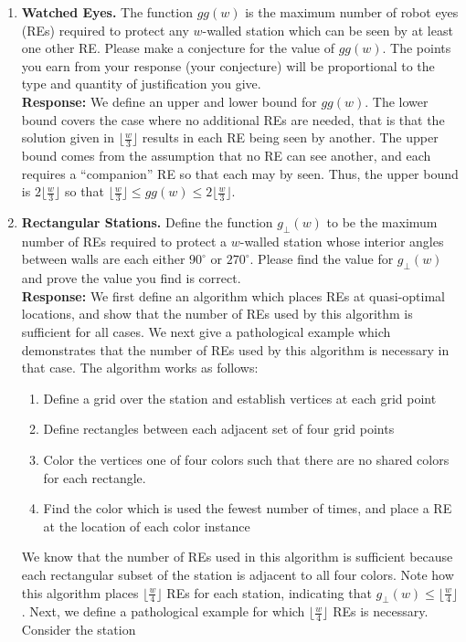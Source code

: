 \documentclass{article}
\newcommand{\response}[1]{\leavevmode\\[0.05in]{\bf Response: } #1 \leavevmode\\[0.05in]}
\begin{document}
\begin{enumerate}
	\item {\bf Watched Eyes.} The function $gg(w)$ is the maximum number of robot eyes (REs) required to protect any $w$-walled station which can be seen by at least one other RE.  Please make a conjecture for the value of $gg(w)$.  The points you earn from your response (your conjecture) will be proportional to the type and quantity of justification you give.  
		\response{We define an upper and lower bound for $gg(w)$.  The lower bound covers the case where no additional REs are needed, that is that the solution given in $\lfloor \frac{w}{3} \rfloor$ results in each RE being seen by another.  The upper bound comes from the assumption that no RE can see another, and each requires a ``companion'' RE so that each may by seen.  Thus, the upper bound is $2\lfloor\frac{w}{3}\rfloor$ so that $\lfloor\frac{w}{3}\rfloor \le gg(w) \le 2\lfloor\frac{w}{3}\rfloor$.}
	\item {\bf Rectangular Stations.}  Define the function $g_{\perp}(w)$ to be the maximum number of REs required to protect a $w$-walled station whose interior angles between walls are each either $90^{\circ}$ or $270^{\circ}$.  Please find the value for $g_{\perp}(w)$ and prove the value you find is correct.
		\response{We first define an algorithm which places REs at quasi-optimal locations, and show that the number of REs used by this algorithm is sufficient for all cases.  We next give a pathological example which demonstrates that the number of REs used by this algorithm is necessary in that case. The algorithm works as follows:
		\begin{enumerate}
			\item Define a grid over the station and establish vertices at each grid point
			\item Define rectangles between each adjacent set of four grid points
			\item Color the vertices one of four colors such that there are no shared colors for each rectangle.
			\item Find the color which is used the fewest number of times, and place a RE at the location of each color instance
		\end{enumerate}
		We know that the number of REs used in this algorithm is sufficient because each rectangular subset of the station is adjacent to all four colors. Note how this algorithm places $\lfloor \frac{w}{4} \rfloor$ REs for each station, indicating that $g_{\perp}(w) \le \lfloor \frac{w}{4}\rfloor$. Next, we define a pathological example for which $\lfloor \frac{w}{4} \rfloor$ REs is necessary. Consider the station 
}
\end{enumerate}
\end{document}
